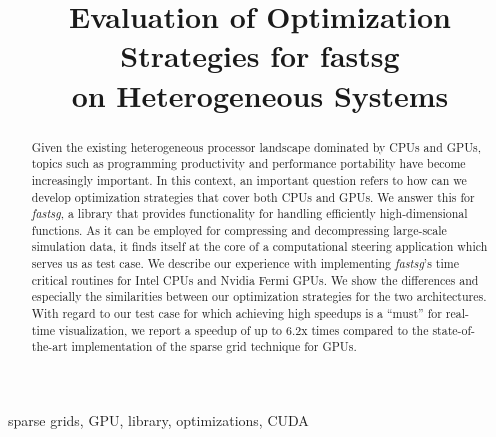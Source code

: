 \documentclass[10pt, conference]{IEEEtran}
\begin{document}
\title{Evaluation of Optimization Strategies for fastsg\\ on Heterogeneous
Systems}
\author{
\and
{}
}

\maketitle

\begin{abstract}
Given the existing heterogeneous processor landscape dominated by CPUs and GPUs,
topics such as programming productivity and performance portability have become
increasingly important. In this context, an important question refers to how can
we develop optimization strategies that cover both CPUs and GPUs. We answer this
for \textit{fastsg}, a library that provides functionality for handling
efficiently high-dimensional functions. As it can be employed for compressing
and decompressing large-scale simulation data, it finds itself at the core of a
computational steering application which serves us as test case. We describe our
experience with implementing \textit{fastsg}'s time critical routines for Intel
CPUs and Nvidia Fermi GPUs. We show the differences and especially the
similarities between our optimization strategies for the two architectures. With
regard to our test case for which achieving high speedups is a ``must'' for
real-time visualization, we report a speedup of up to 6.2x times compared to the
state-of-the-art implementation of the sparse grid technique for GPUs.
\end{abstract}

\begin{IEEEkeywords}
sparse grids, GPU, library, optimizations, CUDA
\end{IEEEkeywords}



















\end{document}
